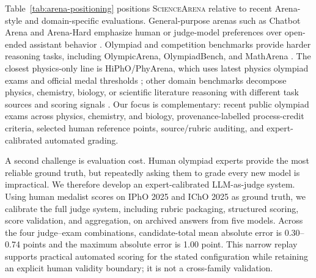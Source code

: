 \documentclass[11pt]{article}
\begin{document}
Table~\ref{tab:arena-positioning} positions \textsc{ScienceArena} relative to recent Arena-style and domain-specific evaluations.
General-purpose arenas such as Chatbot Arena and Arena-Hard emphasize human or judge-model preferences over open-ended assistant behavior \citep{chiang2024chatbotarena,li2024arenahard}.
Olympiad and competition benchmarks provide harder reasoning tasks, including OlympicArena, OlympiadBench, and MathArena \citep{huang2024olympicarena,he2024olympiadbench,balunovic2025matharena}.
The closest physics-only line is HiPhO/PhyArena, which uses latest physics olympiad exams and official medal thresholds \citep{yu2025hipho}; other domain benchmarks decompose physics, chemistry, biology, or scientific literature reasoning with different task sources and scoring signals \citep{dai2025physicsarena,zhao2025superchem,zhou2026babe,zhao2025sciarena}.
Our focus is complementary: recent public olympiad exams across physics, chemistry, and biology, provenance-labelled process-credit criteria, selected human reference points, source/rubric auditing, and expert-calibrated automated grading.






A second challenge is evaluation cost.
Human olympiad experts provide the most reliable ground truth, but repeatedly asking them to grade every new model is impractical.
We therefore develop an expert-calibrated LLM-as-judge system.
Using human medalist scores on IPhO 2025 and IChO 2025 as ground truth, we calibrate the full judge system, including rubric packaging, structured scoring, score validation, and aggregation, on archived answers from five models.
Across the four judge--exam combinations, candidate-total mean absolute error is 0.30--0.74 points and the maximum absolute error is 1.00 point. This narrow replay supports practical automated scoring for the stated configuration while retaining an explicit human validity boundary; it is not a cross-family validation.
\end{document}
